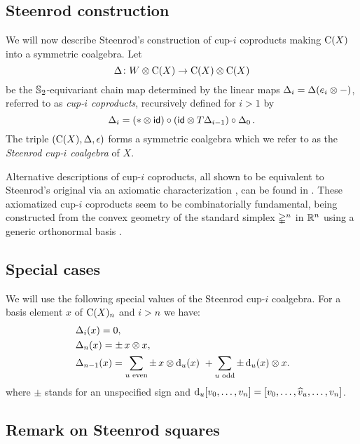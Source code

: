 \subsection{Steenrod construction}\label{ss:cup-i}

We will now describe Steenrod's construction of cup-$i$ coproducts \cite[p.293]{steenrod1947products} making $\operatorname{C}(X)$ into a symmetric coalgebra.
Let
\[
\operatorname{\Delta} \colon W \otimes \operatorname{C}(X) \to \operatorname{C}(X) \otimes \operatorname{C}(X)
\]
be the $\mathbb{S}_2$-equivariant chain map determined by the linear maps $\operatorname{\Delta}_i = \operatorname{\Delta}(e_i \otimes -)$, referred to as \textit{cup-$i$ coproducts}, recursively defined for $i > 1$ by
\begin{equation*}\label{e:cup-i coproducts}
	\operatorname{\Delta}_i =
	(\ast \otimes \mathsf{id}) \circ (\mathsf{id} \otimes T\!\operatorname{\Delta}_{i-1}) \circ \operatorname{\Delta}_0.
\end{equation*}
The triple $(\operatorname{C}(X), \operatorname{\Delta}, \operatorname{\epsilon})$ forms a symmetric coalgebra which we refer to as the \textit{Steenrod cup-$i$ coalgebra} of $X$.

Alternative descriptions of cup-$i$ coproducts, all shown to be equivalent to Steenrod's original via an axiomatic characterization \cite{medina2022axiomatic}, can be found in \cite{real1996computability, gonzalez-diaz1999steenrod, mcclure2003multivariable, medina2023fast_sq}.
These axiomatized cup-$i$ coproducts seem to be combinatorially fundamental, being constructed from the convex geometry of the standard simplex $\mathbb{\Delta}^n$ in $\mathbb{R}^n$ using a generic orthonormal basis \cite{medina2022fib_poly}.

\subsection{Special cases}\label{ss:special_cases}

We will use the following special values of the Steenrod cup-$i$ coalgebra.
For a basis element $x$ of $\operatorname{C}(X)_n$ and $i > n$ we have:
\begin{align}
	&\operatorname{\Delta}_i(x) = 0, \\
	&\operatorname{\Delta}_n(x) = \pm \, x \otimes x, \\
	&\operatorname{\Delta}_{n-1}(x) =
	\sum_{u \text{ even}} \pm \, x \otimes \operatorname{d}_u(x) \ +
	\sum_{u \text{ odd}} \pm \operatorname{d}_u(x) \otimes x.
\end{align}
where $\pm$ stands for an unspecified sign and $\operatorname{d}_u [v_0,\dots,v_n] = [v_0,\dots,\widehat{v}_u,\dots,v_n]$.

\subsection{Remark on Steenrod squares}\label{ss:steenrod squares}

